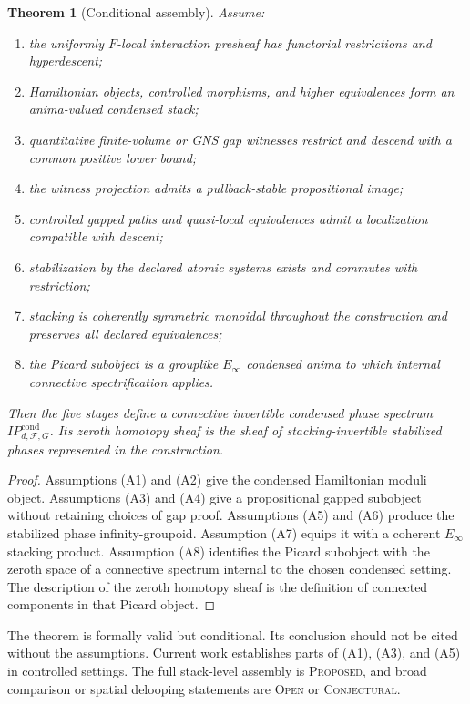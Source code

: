 \documentclass[12pt]{article}
\newtheorem{theorem}{Theorem}[section]
\theoremstyle{definition}
\theoremstyle{remark}
\newcommand{\F}{\mathcal F}
\newcommand{\IP}{\mathit{IP}}
\newcommand{\PROP}{\textnormal{\textsc{Proposed}}}
\newcommand{\CONJ}{\textnormal{\textsc{Conjectural}}}
\newcommand{\OPEN}{\textnormal{\textsc{Open}}}
\begin{document}
\begin{theorem}[Conditional assembly]
\label{thm:conditional-assembly}
Assume:
\begin{enumerate}[label=(A\arabic*),leftmargin=2.7em]
  \item the uniformly $F$-local interaction presheaf has functorial
  restrictions and hyperdescent;
  \item Hamiltonian objects, controlled morphisms, and higher equivalences
  form an anima-valued condensed stack;
  \item quantitative finite-volume or GNS gap witnesses restrict and descend
  with a common positive lower bound;
  \item the witness projection admits a pullback-stable propositional image;
  \item controlled gapped paths and quasi-local equivalences admit a
  localization compatible with descent;
  \item stabilization by the declared atomic systems exists and commutes with
  restriction;
  \item stacking is coherently symmetric monoidal throughout the
  construction and preserves all declared equivalences;
  \item the Picard subobject is a grouplike $E_\infty$ condensed anima to
  which internal connective spectrification applies.
\end{enumerate}
Then the five stages define a connective invertible condensed phase spectrum
$\IP^{\mathrm{cond}}_{d,\F,G}$.  Its zeroth homotopy sheaf is the sheaf of
stacking-invertible stabilized phases represented in the construction.
\end{theorem}

\begin{proof}
Assumptions (A1) and (A2) give the condensed Hamiltonian moduli object.
Assumptions (A3) and (A4) give a propositional gapped subobject without
retaining choices of gap proof.  Assumptions (A5) and (A6) produce the
stabilized phase infinity-groupoid.  Assumption (A7) equips it with a
coherent $E_\infty$ stacking product.  Assumption (A8) identifies the Picard
subobject with the zeroth space of a connective spectrum internal to the
chosen condensed setting.  The description of the zeroth homotopy sheaf is
the definition of connected components in that Picard object.
\end{proof}

The theorem is formally valid but conditional.  Its conclusion should not
be cited without the assumptions.  Current work establishes parts of (A1),
(A3), and (A5) in controlled settings.  The full stack-level assembly is
\PROP{}, and broad comparison or spatial delooping statements are \OPEN{} or
\CONJ{}.
\end{document}
